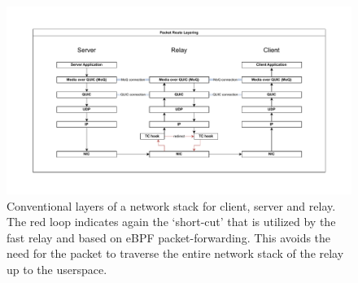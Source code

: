 \begin{figure}[htbp]
    \centering
    \includegraphics[width=\textwidth]{figures/02_background/route-layering.drawio.pdf}
    \caption{Conventional layers of a network stack for client, server and relay.
    The red loop indicates again the `short-cut' that is utilized by the fast relay and 
    based on eBPF packet-forwarding.
    This avoids the need for the packet to traverse the entire network stack of the relay 
    up to the userspace.}\label{fig:route-layering}
\end{figure}

